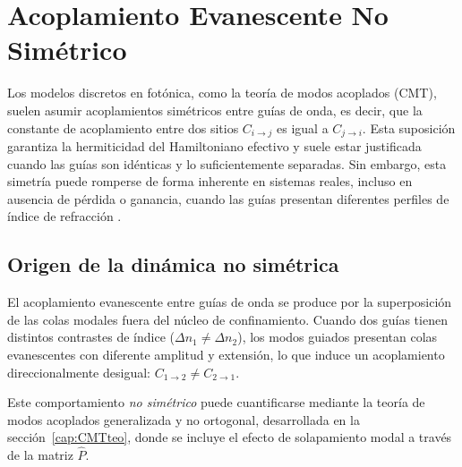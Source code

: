 \chapter{Acoplamiento Evanescente No Simétrico}
\label{cap:asymmetric}

Los modelos discretos en fotónica, como la teoría de modos acoplados (CMT), suelen asumir acoplamientos simétricos entre guías de onda, es decir, que la constante de acoplamiento entre dos sitios \( C_{i \to j} \) es igual a \( C_{j \to i} \). Esta suposición garantiza la hermiticidad del Hamiltoniano efectivo y suele estar justificada cuando las guías son idénticas y lo suficientemente separadas. Sin embargo, esta simetría puede romperse de forma inherente en sistemas reales, incluso en ausencia de pérdida o ganancia, cuando las guías presentan diferentes perfiles de índice de refracción \cite{nonsymm}.

\section{Origen de la dinámica no simétrica}

El acoplamiento evanescente entre guías de onda se produce por la superposición de las colas modales fuera del núcleo de confinamiento. Cuando dos guías tienen distintos contrastes de índice (\( \Delta n_1 \ne \Delta n_2 \)), los modos guiados presentan colas evanescentes con diferente amplitud y extensión, lo que induce un acoplamiento direccionalmente desigual: \( C_{1 \to 2} \ne C_{2 \to 1} \).

Este comportamiento \textit{no simétrico} puede cuantificarse mediante la teoría de modos acoplados generalizada y no ortogonal, desarrollada en la sección~\ref{cap:CMTteo}, donde se incluye el efecto de solapamiento modal a través de la matriz \( \hat{P} \).

